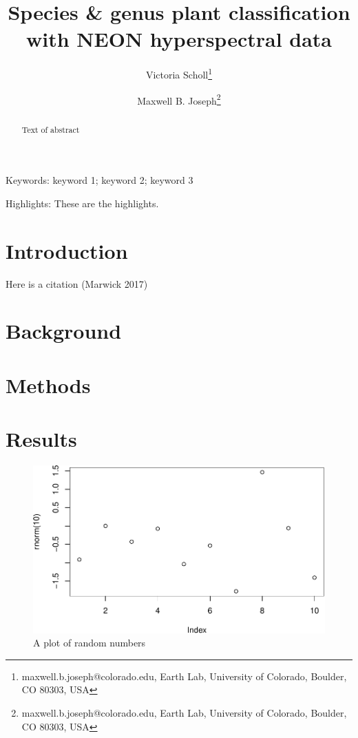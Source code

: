 \documentclass[
]{article}
\title{Species \& genus plant classification with NEON hyperspectral data}
\author{Victoria Scholl\thanks{maxwell.b.joseph@colorado.edu, Earth Lab, University of Colorado, Boulder, CO 80303, USA} \and Maxwell B. Joseph\thanks{maxwell.b.joseph@colorado.edu, Earth Lab, University of Colorado, Boulder, CO 80303, USA}}
\date{}
\begin{document}
\maketitle
\begin{abstract}
Text of abstract
\end{abstract}

Keywords: keyword 1; keyword 2; keyword 3

Highlights: These are the highlights.

\hypertarget{introduction}{%
\section{Introduction}\label{introduction}}

Here is a citation (Marwick 2017)

\hypertarget{background}{%
\section{Background}\label{background}}

\hypertarget{methods}{%
\section{Methods}\label{methods}}

\hypertarget{results}{%
\section{Results}\label{results}}

\begin{figure}
\centering
\includegraphics{../figures/demo-plot-1.pdf}
\caption{\label{fig:demo-plot}A plot of random numbers}
\end{figure}
\end{document}
